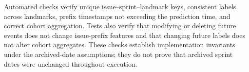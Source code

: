 Automated checks verify unique issue--sprint--landmark keys, consistent labels across landmarks, prefix timestamps not exceeding the prediction time, and correct cohort aggregation. Tests also verify that modifying or deleting future events does not change issue-prefix features and that changing future labels does not alter cohort aggregates. These checks establish implementation invariants under the archived-date assumptions; they do not prove that archived sprint dates were unchanged throughout execution.
